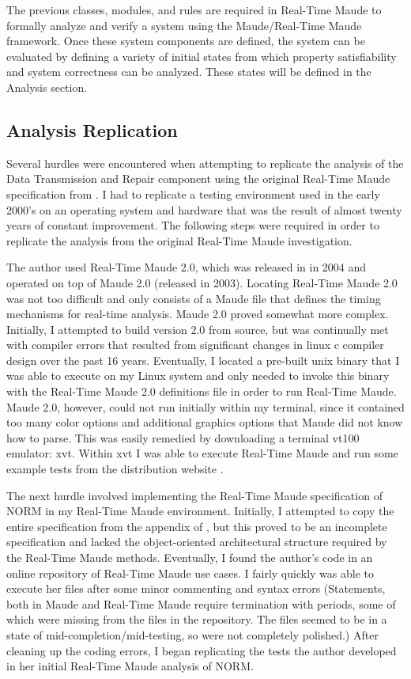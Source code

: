 \documentclass[10pt, journal]{IEEEtran}
\begin{document}
The previous classes, modules, and rules are required in Real-Time Maude to formally analyze and verify a system using the Maude/Real-Time Maude framework. Once these system components are defined, the system can be evaluated by defining a variety of initial states from which property satisfiability and system correctness can be analyzed. These states will be defined in the Analysis section.

\subsection{Analysis Replication}

Several hurdles were encountered when attempting to replicate the analysis of the Data Transmission and Repair component using the original Real-Time Maude specification from \cite{Lien2004}. I had to replicate a testing environment used in the early 2000's on an operating system and hardware that was the result of almost twenty years of constant improvement. The following steps were required in order to replicate the analysis from the original Real-Time Maude investigation.

The author used Real-Time Maude 2.0, which was released in in 2004 and operated on top of Maude 2.0 (released in 2003). Locating Real-Time Maude 2.0 was not too difficult and only consists of a Maude file that defines the timing mechanisms for real-time analysis. Maude 2.0 proved somewhat more complex. Initially, I attempted to build version 2.0 from source, but was continually met with compiler errors that resulted from significant changes in linux c compiler design over the past 16 years. Eventually, I located a pre-built unix binary that I was able to execute on my Linux system and only needed to invoke this binary with the Real-Time Maude 2.0 definitions file in order to run Real-Time Maude. Maude 2.0, however, could not run initially within my terminal, since it contained too many color options and additional graphics options that Maude did not know how to parse. This was easily remedied by downloading a terminal vt100 emulator: xvt. Within xvt I was able to execute Real-Time Maude and run some example tests from the distribution website \cite{rtmaudeUrl}.

The next hurdle involved implementing the Real-Time Maude specification of NORM in my Real-Time Maude environment. Initially, I attempted to copy the entire specification from the appendix of \cite{Lien2004}, but this proved to be an incomplete specification and lacked the object-oriented architectural structure required by the Real-Time Maude methods. Eventually, I found the author's code in an online repository of Real-Time Maude use cases. I fairly quickly was able to execute her files after some minor commenting and syntax errors (Statements, both in Maude and Real-Time Maude require termination with periods, some of which were missing from the files in the repository. The files seemed to be in a state of mid-completion/mid-testing, so were not completely polished.) After cleaning up the coding errors, I began replicating the tests the author developed in her initial Real-Time Maude analysis of NORM.
\end{document}
